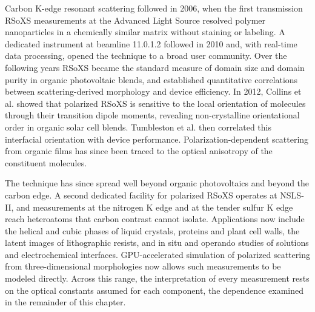 Carbon K-edge resonant scattering followed in 2006, when the first transmission RSoXS measurements at the Advanced Light Source resolved polymer nanoparticles in a chemically similar matrix without staining or labeling.\autocite{arakiResonantSoftXray2006,mitchellMolecularBondSelective2006} A dedicated instrument at beamline 11.0.1.2 followed in 2010 and, with real-time data processing, opened the technique to a broad user community. Over the following years RSoXS became the standard measure of domain size and domain purity in organic photovoltaic blends, and established quantitative correlations between scattering-derived morphology and device efficiency.\autocite{yanCorrelatingEfficiencyNanomorphology2012,jiaoQuantitativeMorphologyPerformance2017} In 2012, Collins et al. showed that polarized RSoXS is sensitive to the local orientation of molecules through their transition dipole moments, revealing non-crystalline orientational order in organic solar cell blends.\autocite{collinsPolarizedXrayScattering2012} Tumbleston et al. then correlated this interfacial orientation with device performance.\autocite{tumblestonInfluenceMolecularOrientation2014} Polarization-dependent scattering from organic films has since been traced to the optical anisotropy of the constituent molecules.\autocite{gannOriginsPolarizationdependentAnisotropic2016}

The technique has since spread well beyond organic photovoltaics and beyond the carbon edge. A second dedicated facility for polarized RSoXS operates at NSLS-II\autocite{gannNISTFacilityResonant2021}, and measurements at the nitrogen K edge and at the tender sulfur K edge reach heteroatoms that carbon contrast cannot isolate\autocite{zhongDecouplingComplexMultiLengthScale2022,freychetResonantTenderXray2021,mcneillResonantTenderXray2023}. Applications now include the helical and cubic phases of liquid crystals\autocite{salamonczykStructureNanoscalepitchHelical2017,caoDecipheringChiralStructures2020,caoMolecularPackingDouble2020}, proteins and plant cell walls\autocite{yeResonantSoftXrayCellulose2018,yeResonantSoftXRay2018,rongpipiResonantXrayScattering2021}, the latent images of lithographic resists\autocite{freychetReconstructingThreedimensionalLatent2019,zhangCharacterizationLatentImage2024}, and in situ and operando studies of solutions and electrochemical interfaces\autocite{zhongProbingMorphologyChemistry2021,yangOperandoResonantSoft2022,grabnerMolecularWeightIndependentPolysoap2024}. GPU-accelerated simulation of polarized scattering from three-dimensional morphologies now allows such measurements to be modeled directly\autocite{saurabhCyRSoXSGPUacceleratedVirtual2023}. Across this range, the interpretation of every measurement rests on the optical constants assumed for each component, the dependence examined in the remainder of this chapter.

